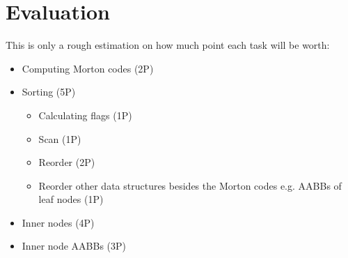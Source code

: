 \documentclass[letterpaper, 10 pt, conference]{IEEEconf}  %
\begin{document}
\section{Evaluation}

This is only a rough estimation on how much point each task will be worth:
\begin{itemize}
  \item Computing Morton codes (2P)
  \item Sorting (5P)
  \begin{itemize}
    \item Calculating flags (1P)
    \item Scan (1P)
    \item Reorder (2P)
    \item Reorder other data structures besides the Morton codes e.g. AABBs of leaf nodes (1P)
  \end{itemize}
  \item Inner nodes (4P)
  \item Inner node AABBs (3P)
\end{itemize}

\addtolength{\textheight}{-12cm}   %










\end{document}
